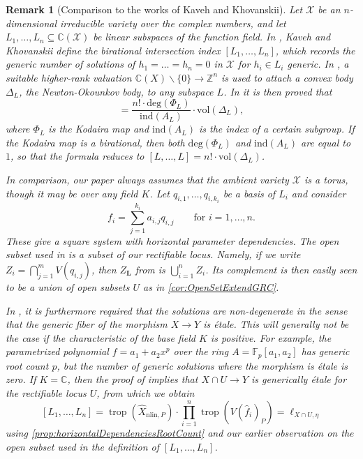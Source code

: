 \documentclass[12pt,reqno,a4paper]{amsart}
\theoremstyle{theoremstyle}
\theoremstyle{examplestyle}
\newtheorem{remark}[theorem]{Remark}
\theoremstyle{algorithmstyle}
\newcommand{\nlin}{{\mathrm{nlin}}}
\DeclareMathOperator{\trop}{trop}
\begin{document}
\begin{remark}[Comparison to the works of Kaveh and Khovanskii]
  Let $\mathcal X$ be an $n$-dimensional irreducible variety over the complex numbers, and let $L_{1},\dots,L_n\subseteq\mathbb{C}(\mathcal X)$ be linear subspaces of the function field.
  In \cite{KavehKhovanskii2010}, Kaveh and Khovanskii define the \emph{birational intersection index} $[L_{1},\dots ,L_{n}]$, which records the generic number of solutions of $h_{1}=\dots=h_{n}=0$ in $\mathcal X$ for $h_{i}\in L_i$ generic.
  In \cite{KavehKhovanskii2012}, a suitable higher-rank valuation $\mathbb{C}(X)\backslash\{0\}\to\mathbb{Z}^{n}$ is used to  attach a convex body $\Delta_{L}$, the \emph{Newton-Okounkov body}, to any subspace $L$. In \cite[Theorem 4.9]{KavehKhovanskii2012} it is then proved that
  \begin{equation*}
    [L,\dots ,L]=\dfrac{n! \cdot  \mathrm{deg}(\Phi_{L})}{\mathrm{ind}(A_{L})}\cdot \mathrm{vol}(\Delta_{L}),
  \end{equation*}
  where $\Phi_{L}$ is the Kodaira map and $\mathrm{ind}(A_{L})$ is the index of a certain subgroup. %
  If the Kodaira map is a birational, then both $\mathrm{deg}(\Phi_{L})$ and $\mathrm{ind}(A_{L})$ are equal to $1$, so that the formula reduces to $[L,\dots ,L]=n! \cdot \mathrm{vol}(\Delta_{L})$.

  In comparison, our paper always assumes that the ambient variety $\mathcal X$ is a torus, though it may be over any field $K$. Let $q_{i,1},\dots,q_{i,k_i}$ be a basis of $L_{i}$ and consider
  \begin{equation*}
    f_{i}=\sum_{j=1}^{k_i} a_{i,j}q_{i,j} \qquad \text{for } i=1,\dots,n.
  \end{equation*}
   These give a square system with horizontal parameter dependencies. The open subset used in \cite[Definition 4.5 (1)]{KavehKhovanskii2012} is a subset of our rectifiable locus. Namely, if we write $Z_{i}=\bigcap_{j=1}^m V(q_{i,j})$, then $Z_{\mathbf{L}}$ from \cite[Section 4.2]{KavehKhovanskii2012} is $\bigcup_{i=1}^{n} Z_{i}$. Its complement is then easily seen to be a union of open subsets $U$ as in \cref{cor:OpenSetExtendGRC}.

  In \cite[Definition 4.5 (2)]{KavehKhovanskii2012}, it is furthermore required that the solutions are non-degenerate in the sense that the generic fiber of the morphism $X\to{Y}$ is \'{e}tale. This will generally not be the case if the characteristic of the base field $K$ is positive.
  For example, the parametrized polynomial $f=a_{1}+a_{2}x^{p}$ over the ring $A=\mathbb{F}_{p}[a_{1},a_{2}]$ has generic root count $p$, but the number of generic solutions where the morphism is \'{e}tale is zero. If $K=\mathbb{C}$, then the proof of \cite[Proposition 5.7]{KavehKhovanskii2010} implies that $X\cap U\to{Y}$ is generically \'{e}tale for the rectifiable locus $U$, from which we obtain
  \[ [L_1,\dots,L_n] = \trop(\widehat X_{\nlin,P})\cdot \prod_{i=1}^n \trop(V(\widehat{f}_{i})_{P}) = \ell_{X\cap U,\eta} \]
  using \cref{prop:horizontalDependenciesRootCount} and our earlier observation on the open subset used in the definition of $[L_{1},\dots ,L_{n}]$.
\end{remark}
\end{document}
